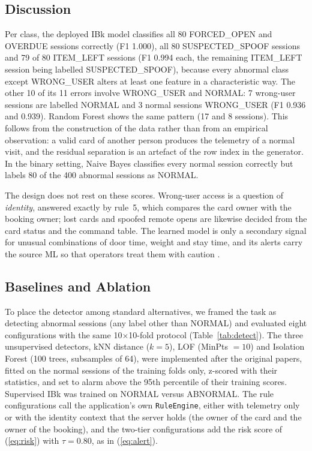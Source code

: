 \subsection{Discussion}\label{sec:discussion}

Per class, the deployed IBk model classifies all 80 FORCED\_OPEN and OVERDUE sessions correctly (F1 1.000), all 80
SUSPECTED\_SPOOF sessions and 79 of 80 ITEM\_LEFT sessions (F1 0.994 each, the remaining ITEM\_LEFT session being
labelled SUSPECTED\_SPOOF), because every abnormal class except WRONG\_USER alters at least one feature in a
characteristic way. The other 10 of its 11 errors involve WRONG\_USER and NORMAL: 7 wrong-user sessions are labelled
NORMAL and 3 normal sessions WRONG\_USER (F1 0.936 and 0.939). Random Forest shows the same pattern (17 and 8 sessions).
This follows from the construction of the data rather than from an empirical observation: a valid card of another
person produces the telemetry of a normal visit, and the residual separation is an artefact of the row index in the
generator. In the binary setting, Naive Bayes classifies every normal session correctly but labels 80 of the 400
abnormal sessions as NORMAL.

The design does not rest on these scores. Wrong-user access is a question of \emph{identity}, answered exactly by
rule~5, which compares the card owner with the booking owner; lost cards and spoofed remote opens are likewise decided
from the card status and the command table. The learned model is only a secondary signal for unusual combinations of
door time, weight and stay time, and its alerts carry the source ML so that operators treat them with caution
\cite{sommer2010outside}.

\subsection{Baselines and Ablation}\label{sec:ablation}

To place the detector among standard alternatives, we framed the task as detecting abnormal sessions (any label other
than NORMAL) and evaluated eight configurations with the same 10$\times$10-fold protocol (Table~\ref{tab:detect}). The
three unsupervised detectors, kNN distance ($k=5$), LOF \cite{breunig2000lof} (MinPts $=10$) and Isolation Forest
\cite{liu2008isolation} (100 trees, subsamples of 64), were implemented after the original papers, fitted on the normal
sessions of the training folds only, z-scored with their statistics, and set to alarm above the 95th percentile of their
training scores. Supervised IBk was trained on NORMAL versus ABNORMAL. The rule configurations call the application's
own \texttt{RuleEngine}, either with telemetry only or with the identity context that the server holds (the owner of the
card and the owner of the booking), and the two-tier configurations add the risk score of (\ref{eq:risk}) with
$\tau = 0.80$, as in (\ref{eq:alert}).

